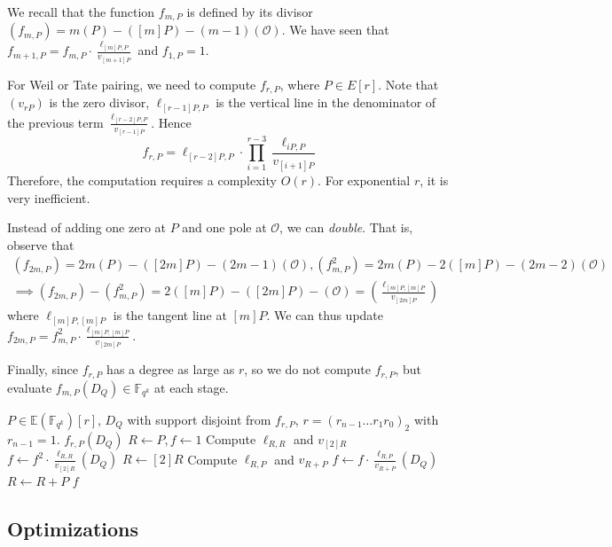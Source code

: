 We recall that the function $f_{m,P}$ is defined by its divisor $(f_{m,P}) = m(P) - ([m]P) - (m-1)(\mathcal{O})$. We have seen that $f_{m+1, P} = f_{m, P} \cdot \frac{\ell_{[m]P, P}}{v_{[m+1]P}}$ and $f_{1,P} = 1$.

For Weil or Tate pairing, we need to compute $f_{r,P}$, where $P \in E[r]$. Note that $(v_{rP})$ is the zero divisor, $\ell_{[r-1]P, P}$ is the vertical line in the denominator of the previous term $\frac{\ell_{[r-2]P, P}}{v_{[r-1]P}}$. Hence
\[
	f_{r,P} = \ell_{[r-2]P, P} \cdot \prod_{i=1}^{r-3} \frac{\ell_{iP, P}}{v_{[i+1]P}}
\]
Therefore, the computation requires a complexity $O(r)$. For exponential $r$, it is very inefficient.

Instead of adding one zero at $P$ and one pole at $\mathcal{O}$, we can \emph{double}. That is, observe that
\begin{gather*}
	(f_{2m,P}) = 2m(P) - ([2m]P) - (2m-1)(\mathcal{O}), (f_{m,P}^2) = 2m(P) - 2([m]P) - (2m-2)(\mathcal{O}) \\
\implies (f_{2m,P}) - (f_{m,P}^2) = 2([m]P) - ([2m]P) - (\mathcal{O}) = \left(\frac{\ell_{[m]P, [m]P}}{v_{[2m]P}}\right)
\end{gather*}
where $\ell_{[m]P, [m]P}$ is the tangent line at $[m]P$. We can thus update $f_{2m,P} = f_{m,P}^2 \cdot \frac{\ell_{[m]P, [m]P}}{v_{[2m]P}}$.

Finally, since $f_{r,P}$ has a degree as large as $r$, so we do not compute $f_{r,P}$, but evaluate $f_{m,P}(D_Q) \in \mathbb{F}_{q^k}$ at each stage.
\begin{algorithm}[H]
	\caption{Miller's Algorithm}
	\label{alg:miller}
	\begin{algorithmic}[1]
		\Require $P \in \mathbb{E}(\mathbb{F}_{q^k})[r]$, $D_Q$ with support disjoint from $f_{r,P}$, $r = (r_{n-1} \dots r_1r_0)_2$ with $r_{n-1} = 1$.
		\Ensure $f_{r,P}(D_Q)$
		\State $R \gets P, f \gets 1$
			\State Compute $\ell_{R,R}$ and $v_{[2]R}$
			\State $f \gets f^2 \cdot \frac{\ell_{R,R}}{v_{[2]R}}(D_Q)$
			\State $R \gets [2]R$
				\State Compute $\ell_{R,P}$ and $v_{R+P}$
				\State $f \gets f \cdot \frac{\ell_{R,P}}{v_{R+P}}(D_Q)$
				\State $R \gets R + P$
			\EndIf
		\EndFor
		\State \Return $f$

	\end{algorithmic}
\end{algorithm}

\subsection{Optimizations}

